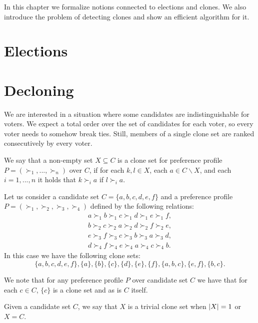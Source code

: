 In this chapter we formalize notions connected to elections and clones.
We also introduce the problem of detecting clones and show an efficient algorithm for it.

\section{Elections} 

\section{Decloning}

We are interested in a situation where some candidates are indistinguishable for voters.
We expect a total order over the set of candidates for each voter,
so every voter needs to somehow break ties.
Still, members of a single clone set are ranked consecutively by every voter.

\begin{defn}
We say that a non-empty set $X \subseteq C$ is a clone set
for preference profile $P = (\succ_1, ... , \succ_n)$ over $C$,
if for each $k,l \in X$, each $a \in C \backslash X$, and each $i=1, ..., n$ it holds that
$k \succ_i a$ if $l \succ_i a$.
\end{defn}

\begin{exmp} \label{clone-sets}
Let us consider a candidate set $C = \{a,b,c,d,e,f\}$
and a preference profile $P = (\succ_1, \succ_2, \succ_3, \succ_4)$ defined by the following relations:
\begin{align*}
a \succ_1 b \succ_1 c \succ_1 d \succ_1 e \succ_1 f, \\
b \succ_2 c \succ_2 a \succ_2 d \succ_2 f \succ_2 e, \\
e \succ_3 f \succ_3 c \succ_3 b \succ_3 a \succ_3 d, \\
d \succ_4 f \succ_4 e \succ_4 a \succ_4 c \succ_4 b.
\end{align*}
In this case we have the following clone sets:
$$\{a,b,c,d,e,f\}, \{a\}, \{b\}, \{c\}, \{d\}, \{e\}, \{f\}, \{a,b,c\}, \{e,f\}, \{b,c\}.$$
\end{exmp}

\begin{rmrk}
We note that for any preference profile $P$ over candidate set $C$
we have that for each $c \in C$, $\{c\}$ is a clone set and as is $C$ itself.
\end{rmrk}

\begin{defn}
Given a candidate set $C$, we say that $X$ is a trivial clone set
when $\left\vert X \right\vert = 1$ or $X = C$.
\end{defn}

